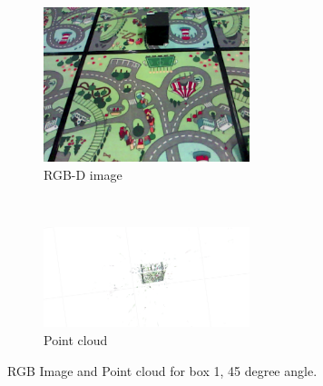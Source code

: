 \documentclass[12pt,a4paper]{article}
\begin{document}
\begin{figure}[h]
  \begin{subfigure}[t]{0.5\textwidth}
  \centering
    \includegraphics[width=60mm]{box_test/cpp-headless-output-118_4_16_1_57_40_1526435860119.png}
  \caption{RGB-D image}
  \end{subfigure}%
  ~
  \begin{subfigure}[t]{0.5\textwidth}
  \centering
    \includegraphics[width=60mm, trim =230mm 100mm 200mm 70mm, clip]{box_test/no_vicon1_36.png}
  \caption{Point cloud}
  \end{subfigure}
  \caption{RGB Image and Point cloud for box 1, 45 degree angle.}
\end{figure}
\end{document}
